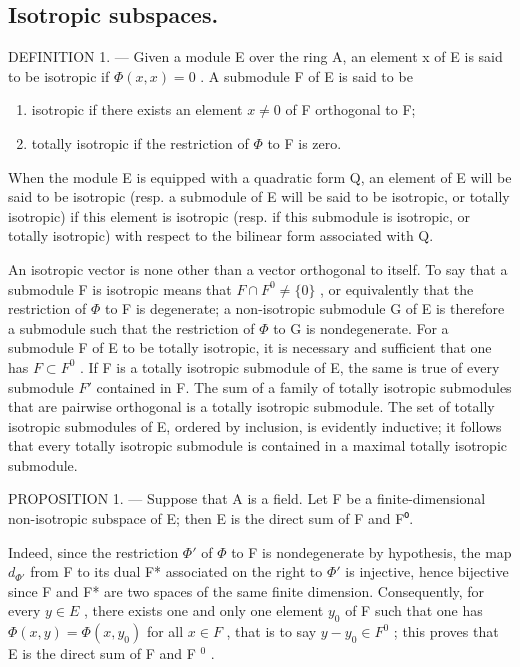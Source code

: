\subsection{Isotropic subspaces.}

DEFINITION 1. --- Given a module E over the ring A, an element x of E is said to be isotropic if \(\Phi(x, x) = 0\) . A submodule F of E is said to be

\begin{enumerate}
\def\labelenumi{\arabic{enumi})}
\item
  isotropic if there exists an element \(x \neq 0\) of F orthogonal to F;
\item
  totally isotropic if the restriction of \(\Phi\) to F is zero.
\end{enumerate}

When the module E is equipped with a quadratic form Q, an element of E will be said to be isotropic (resp. a submodule of E will be said to be isotropic, or totally isotropic) if this element is isotropic (resp. if this submodule is isotropic, or totally isotropic) with respect to the bilinear form associated with Q.

An isotropic vector is none other than a vector orthogonal to itself. To say that a submodule F is isotropic means that \(F \cap F^{0} \neq \{0\}\) , or equivalently that the restriction of \(\Phi\) to F is degenerate; a non-isotropic submodule G of E is therefore a submodule such that the restriction of \(\Phi\) to G is nondegenerate. For a submodule F of E to be totally isotropic, it is necessary and sufficient that one has \(F \subset F^{0}\) . If F is a totally isotropic submodule of E, the same is true of every submodule \(F'\) contained in F. The sum of a family of totally isotropic submodules that are pairwise orthogonal is a totally isotropic submodule. The set of totally isotropic submodules of E, ordered by inclusion, is evidently inductive; it follows that every totally isotropic submodule is contained in a maximal totally isotropic submodule.

PROPOSITION 1. --- Suppose that A is a field. Let F be a finite-dimensional non-isotropic subspace of E; then E is the direct sum of F and F⁰.

Indeed, since the restriction \(\Phi'\) of \(\Phi\) to F is nondegenerate by hypothesis, the map \(d_{\Phi'}\) from F to its dual F* associated on the right to \(\Phi'\) is injective, hence bijective since F and F* are two spaces of the same finite dimension. Consequently, for every \(y \in E\) , there exists one and only one element \(y_0\) of F such that one has \(\Phi(x, y) = \Phi(x, y_0)\) for all \(x \in F\) , that is to say \(y - y_0 \in F^0\) ; this proves that E is the direct sum of F and F \(^0\) .

